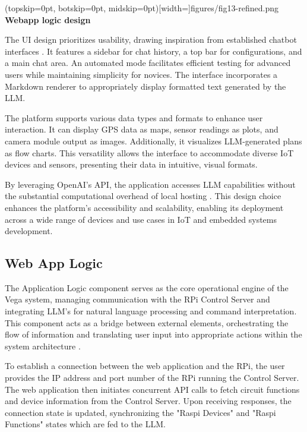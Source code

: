 \documentclass{ieeeaccess}
\begin{document}
\Figure[t!](topskip=0pt, botskip=0pt,
midskip=0pt)[width=\textwidth]{{figures/fig13-refined.png}}
{ \textbf{Webapp logic design}\label{fig5}}


The UI design prioritizes usability, drawing inspiration from established chatbot interfaces \cite{OpenAI_GPT}. It features a sidebar for chat history, a top bar for configurations, and a main chat area. An automated mode facilitates efficient testing for advanced users while maintaining simplicity for novices. The interface incorporates a Markdown renderer to appropriately display formatted text generated by the LLM.


The platform supports various data types and formats to enhance user interaction. It can display GPS data as maps, sensor readings as plots, and camera module output as images. Additionally, it visualizes LLM-generated plans as flow charts. This versatility allows the interface to accommodate diverse IoT devices and sensors, presenting their data in intuitive, visual formats.

By leveraging OpenAI's API, the application accesses LLM capabilities without the substantial computational overhead of local hosting \cite{kim2024llmemestimatinggpumemory}. This design choice enhances the platform's accessibility and scalability, enabling its deployment across a wide range of devices and use cases in IoT and embedded systems development.


\subsection{Web App Logic}
The Application Logic component serves as the core operational engine of the Vega system, managing communication with the RPi Control Server and integrating LLM's for natural language processing and command interpretation. This component acts as a bridge between external elements, orchestrating the flow of information and translating user input into appropriate actions within the system architecture \cite{bass2003software}.

To establish a connection between the web application and the RPi, the user provides the IP address and port number of the RPi running the Control Server. The web application then initiates concurrent API calls to fetch circuit functions and device information from the Control Server. Upon receiving responses, the connection state is updated, synchronizing the "Raspi Devices" and "Raspi Functions" states which are fed to the LLM.
\end{document}
